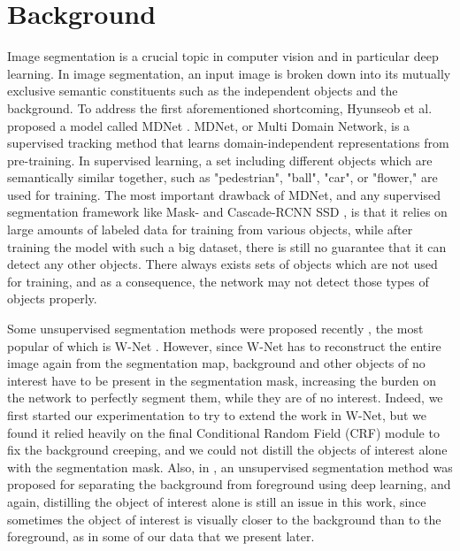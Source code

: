 \documentclass[./dissertation.tex]{subfiles}
\begin{document}
\label{cc:Background}
\section{Background}

Image segmentation is a crucial topic in computer vision and in particular deep learning. In image segmentation, an input image is broken down into its mutually exclusive semantic constituents such as the independent objects and the background. To address the first aforementioned shortcoming, Hyunseob et al. proposed a model called MDNet \cite{nam2016learning}. MDNet, or Multi Domain Network, is a supervised tracking method that learns domain-independent representations from pre-training. In supervised learning, a set including different objects which are semantically similar together, such as "pedestrian", "ball", "car", or "flower," are used for training. The most important drawback of MDNet, and any supervised segmentation framework like Mask- and Cascade-RCNN \cite{he2018maskrcnn,cai2018cascade} SSD \cite{liu2016ssd}, is that it relies on large amounts of labeled data for training from various objects, while after training the model with such a big dataset, there is still no guarantee that it can detect any other objects. There always exists sets of objects which are not used for training, and as a consequence, the network may not detect those types of objects properly.

Some unsupervised segmentation methods were proposed recently \cite{croitoru2019unsupervised,ji2019invariant,liu2014mslrr,xia2017w}, the most popular of which is W-Net \cite{xia2017w}. However, since W-Net has to reconstruct the entire image again from the segmentation map, background and other objects of no interest have to be present in the segmentation mask, increasing the burden on the network to perfectly segment them, while they are of no interest. Indeed, we first started our experimentation to try to extend the work in W-Net, but we found it relied heavily on the final Conditional Random Field (CRF) module to fix the background creeping, and we could not distill the objects of interest alone with the segmentation mask. Also, in \cite{croitoru2019unsupervised}, an unsupervised segmentation method was proposed for separating the background from foreground using deep learning, and again, distilling the object of interest alone is still an issue in this work, since sometimes the object of interest is visually closer to the background than to the foreground, as in some of our data that we present later.
\end{document}
